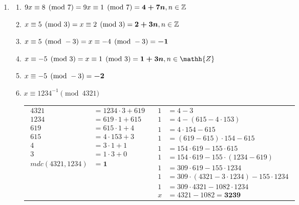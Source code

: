\documentclass[fleqn]{article}
\begin{document}
\begin{enumerate}[label=\textbf{\arabic*})]
\begin{enumerate}
\end{enumerate}

\item

\begin{enumerate}

\item $9x \equiv 8 \pmod{7} \\
= 9x \equiv 1 \pmod{7} \\
= \boldsymbol{4 + 7n}, n \in \mathbb{Z}$

\item $x \equiv 5 \pmod{3} \\
= x \equiv 2 \pmod{3} \\
= \boldsymbol{2 + 3n}, n \in \mathbb{Z}$

\item $x \equiv 5 \pmod{-3} \\
= x \equiv -4 \pmod{-3} \\
= \boldsymbol{-1}$

\item $x \equiv -5 \pmod{3} \\
= x \equiv 1 \pmod{3} \\
= \boldsymbol{1 + 3n}, n \in \mathh{Z}$

\item $x \equiv -5 \pmod{-3} \\
= \boldsymbol{-2}$

\item $x \equiv 1234^{-1} \pmod{4321}$

\begin{tabular}{*{2}{c}}
$\begin{aligned}
4321 &= 1234 \cdot 3 + 619 \\
1234 &= 619 \cdot 1 + 615 \\
619 &= 615 \cdot 1 + 4 \\
615 &= 4 \cdot 153 + 3 \\
4 &= 3 \cdot 1 + 1 \\
3 &= 1 \cdot 3 + 0 \\
mdc(4321, 1234) &= \boldsymbol{1}
\end{aligned}$ &
$\begin{aligned}
1 &= 4 - 3 \\
1 &= 4 - (615 - 4 \cdot 153) \\
1 &= 4 \cdot 154 - 615 \\
1 &= (619 - 615) \cdot 154 - 615 \\
1 &= 154 \cdot 619 - 155 \cdot 615 \\
1 &= 154 \cdot 619 - 155 \cdot (1234 - 619) \\
1 &= 309 \cdot 619 - 155 \cdot 1234 \\
1 &= 309 \cdot (4321 - 3 \cdot 1234) - 155 \cdot 1234 \\
1 &= 309 \cdot 4321 - 1082 \cdot 1234 \\
x &= 4321 - 1082 = \boldsymbol{3239}
\end{aligned}$
\end{tabular}


\end{enumerate}
\end{enumerate}
\end{document}
